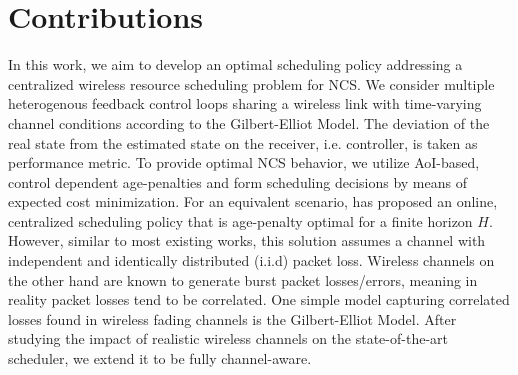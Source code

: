 \section*{Contributions}
In this work, we aim to develop an optimal scheduling policy addressing a
centralized wireless resource scheduling problem for NCS. We consider multiple
heterogenous feedback control loops sharing a wireless link with time-varying
channel conditions according to the Gilbert-Elliot Model. The deviation of the
real state from the estimated state on the receiver, i.e. controller, is taken
as performance metric. To provide optimal NCS behavior, we utilize AoI-based,
control dependent age-penalties and form scheduling decisions by means of
expected cost minimization. For an equivalent scenario, \cite{ayan2020aoi} has
proposed an online, centralized scheduling policy that is age-penalty optimal
for a finite horizon $H$. However, similar to most existing works, this solution
assumes a channel with independent and identically distributed (i.i.d) packet
loss. Wireless channels on the other hand are known to generate burst packet
losses/errors, meaning in reality packet losses tend to be correlated. One
simple model capturing correlated losses found in wireless fading channels is
the Gilbert-Elliot Model. After studying the impact of realistic wireless
channels on the state-of-the-art scheduler, we extend it to be fully
channel-aware. 

